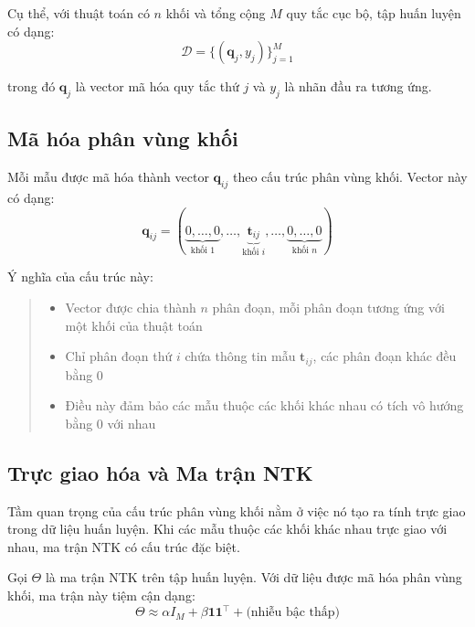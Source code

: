 Cụ thể, với thuật toán có $n$ khối và tổng cộng $M$ quy tắc cục bộ, tập huấn luyện có dạng:
\begin{equation}
    \mathcal{D} = \{(\mathbf{q}_j, y_j)\}_{j=1}^{M}
\end{equation}

trong đó $\mathbf{q}_j$ là vector mã hóa quy tắc thứ $j$ và $y_j$ là nhãn đầu ra tương ứng.

\subsection{Mã hóa phân vùng khối}

Mỗi mẫu được mã hóa thành vector $\mathbf{q}_{ij}$ theo cấu trúc phân vùng khối. Vector này có dạng:
\begin{equation}
    \mathbf{q}_{ij} = (\underbrace{0, \ldots, 0}_{\text{khối } 1}, \ldots, \underbrace{\mathbf{t}_{ij}}_{\text{khối } i}, \ldots, \underbrace{0, \ldots, 0}_{\text{khối } n})
\end{equation}

Ý nghĩa của cấu trúc này:
\begin{quote}
\begin{itemize}
    \item Vector được chia thành $n$ phân đoạn, mỗi phân đoạn tương ứng với một khối của thuật toán
    \item Chỉ phân đoạn thứ $i$ chứa thông tin mẫu $\mathbf{t}_{ij}$, các phân đoạn khác đều bằng 0
    \item Điều này đảm bảo các mẫu thuộc các khối khác nhau có tích vô hướng bằng 0 với nhau
\end{itemize}
\end{quote}

\subsection{Trực giao hóa và Ma trận NTK}

Tầm quan trọng của cấu trúc phân vùng khối nằm ở việc nó tạo ra tính trực giao trong dữ liệu huấn luyện. Khi các mẫu thuộc các khối khác nhau trực giao với nhau, ma trận NTK có cấu trúc đặc biệt.

Gọi $\Theta$ là ma trận NTK trên tập huấn luyện. Với dữ liệu được mã hóa phân vùng khối, ma trận này tiệm cận dạng:
\begin{equation}
    \Theta \approx \alpha I_M + \beta \mathbf{1}\mathbf{1}^\top + \text{(nhiễu bậc thấp)}
\end{equation}

